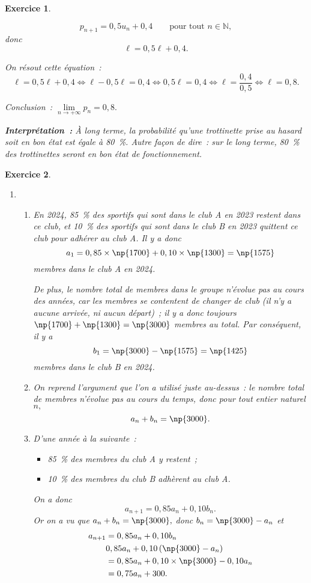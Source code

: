 \documentclass[10pt]{article}
\newtheorem{exo}{Exercice}
\begin{document}
\begin{exo}
\begin{enumerate}
\[p_{n+1}=0,5u_n+0,4\qquad\text{pour tout }n\in\mathbb{N},\] donc
\[\ell=0,5\ell+0,4.\]

On résout cette équation~:
\[\ell=0,5\ell+0,4\iff \ell-0,5\ell=0,4\iff 0,5\ell=0,4\iff\ell=\frac{0,4}{0,5}\iff \ell=0,8.\]

Conclusion~: $\lim\limits_{n\to +\infty}p_n=0,8.$

\medskip

\textbf{Interprétation~:} \`A long terme, la probabilité qu'une trottinette prise au hasard soit en bon état est égale à 80~\%. Autre façon de dire~: sur le long terme, 80~\% des trottinettes seront en bon état de fonctionnement.
\end{enumerate}

\end{exo}

\begin{exo}




\begin{enumerate}
\item \begin{enumerate}
\item En 2024, 85~\% des  sportifs qui sont dans le club A en 2023 restent dans ce club, et 10~\% des  sportifs qui sont dans le club B en 2023 quittent ce club pour adhérer au club A. Il y a donc
\[a_1=0,85\times\np{1700}+0,10\times \np{1300}=\np{1575}\] membres dans le club A en 2024.

\medskip

De plus, le nombre total de membres dans le groupe n'évolue pas au cours des années, car les membres se contentent de changer de club (il n'y a aucune arrivée, ni aucun départ)~; il y a donc toujours $\np{1700}+\np{1300}=\np{3000}$ membres au total. Par conséquent, il y a
\[b_1=\np{3000}-\np{1575}=\np{1425}\] membres dans le club B en 2024.
\item On reprend l'argument que l'on a utilisé juste au-dessus~: le nombre total de membres n'évolue pas au cours du temps, donc pour tout entier naturel $n,$ 
\[a_n+b_n=\np{3000}.\]
\item D'une année à la suivante~:
\begin{itemize}
\item[\textbullet] 85~\% des membres du club A y restent~;
\item[\textbullet] 10~\% des membres du club B  adhèrent au club A.
\end{itemize}

On a donc
\[a_{n+1}=0,85a_n+0,10b_n.\] Or on a vu que $a_n+b_n=\np{3000},$ donc $b_n=\np{3000}-a_n$ et
\begin{align*}
a_{n+1}&=0,85a_n+0,10b_n
\\&0,85a_n+0,10\left(\np{3000}-a_n\right)
\\&=0,85a_n+0,10\times\np{3000}-0,10 a_n
\\&=0,75a_n+300.
\end{align*}


\end{enumerate}
\end{enumerate}
\end{exo}
\end{document}
